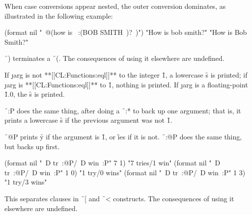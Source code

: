 When case conversions appear nested, the outer conversion dominates, as illustrated in the following example:

\code
 (format nil "~@(how is ~:(BOB SMITH~)?~)")
 \EV "How is bob smith?"
 \NV "How is Bob Smith?" \endcode

\endsubsubsection%

 

\f{~)} terminates a \f{~(}. The consequences of using it elsewhere are undefined.

\endsubsubsection%

 

If \j{arg} is not **[[CL:Functions:eql]]**  to the integer \f{1}, a lowercase \f{s} is printed; if \j{arg} is **[[CL:Functions:eql]]** to \f{1}, nothing is printed.   If \j{arg} is a floating-point \f{1.0}, the \f{s} is printed.

\f{~:P} does the same thing,  after doing a \f{~:*} to back up one argument; that is, it prints a lowercase \f{s} if the previous argument was not \f{1}.  

\f{~@P}  prints \f{y} if the argument is \f{1}, or \f{ies} if it is not.  \f{~:@P} does the same thing, but backs up first.

\code
 (format nil "~D tr~:@P/~D win~:P" 7 1) \EV "7 tries/1 win"
 (format nil "~D tr~:@P/~D win~:P" 1 0) \EV "1 try/0 wins"
 (format nil "~D tr~:@P/~D win~:P" 1 3) \EV "1 try/3 wins" \endcode

\endsubsubsection%

\endsubsection%


 

This separates clauses in \f{~[} and \f{~<} constructs. The consequences of using it elsewhere are undefined.

\endsubsubsection%

 

